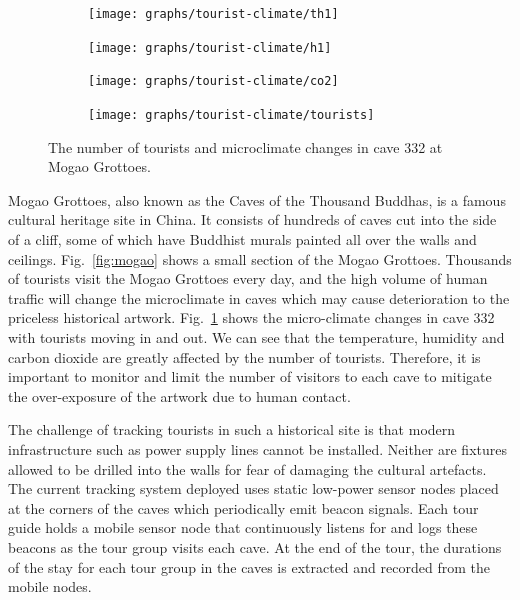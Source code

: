 \documentclass[twoside,twocolumn]{article}
\begin{document}
\begin{figure}[t]
   \centering
   \begin{subfigure}
       \centering
       \texttt{[image: graphs/tourist-climate/th1]}
   \end{subfigure}
   \begin{subfigure}
       \centering
       \texttt{[image: graphs/tourist-climate/h1]}
   \end{subfigure}
   \begin{subfigure}
       \centering
       \texttt{[image: graphs/tourist-climate/co2]}
   \end{subfigure}
   \begin{subfigure}
       \centering
       \texttt{[image: graphs/tourist-climate/tourists]}
   \end{subfigure}
  \caption{The number of tourists and microclimate changes in cave 332 at Mogao Grottoes.} 
  \label{fig:microclimate}
\end{figure}

Mogao Grottoes, also known as the Caves of the Thousand Buddhas, is a
famous cultural heritage site in China. It consists of hundreds of
caves cut into the side of a cliff, some of which have Buddhist murals
painted all over the walls and ceilings.  Fig.~\ref{fig:mogao} shows
a small section of the Mogao Grottoes. Thousands of tourists visit the
Mogao Grottoes every day, and the high volume of human traffic will
change the microclimate in caves which may cause deterioration to the 
priceless historical artwork. Fig.~\ref{fig:microclimate} shows the 
micro-climate changes in cave 332 with tourists moving in and out. 
We can see that the temperature, humidity and carbon dioxide are greatly
affected by the number of tourists. Therefore, it is important to monitor 
and limit the number of visitors to each cave to mitigate the over-exposure 
of the artwork due to human contact.

The challenge of tracking tourists in such a historical site is that
modern infrastructure such as power supply lines cannot be installed. 
Neither are fixtures allowed to be drilled into the walls
for fear of damaging the cultural artefacts. The current tracking
system deployed uses static low-power sensor nodes placed at the
corners of the caves which periodically emit beacon signals.  Each
tour guide holds a mobile sensor node that continuously listens for
and logs these beacons as the tour group visits each cave.  At the end
of the tour, the durations of the stay for each tour group in the
caves is extracted and recorded from the mobile nodes.
\end{document}
